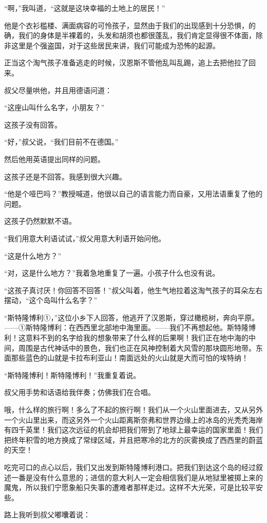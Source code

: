 \documentclass[10pt]{book}
\begin{document}
“啊，”我叫道，“这就是这块幸福的土地上的居民！”

他是个衣衫槛楼、满面病容的可怜孩子，显然由于我们的出现感到十分恐惧，的确，我们的身体是半裸着的，头发和胡须也都很蓬乱，我们肯定显得很不体面，除非这里是个强盗国，对于这些居民来讲，我们可能成为恐怖的起源。

正当这个淘气孩子准备逃走的时候，汉恩斯不管他乱叫乱踢，追上去把他拉了回来。

叔父尽量哄他，并且用德语问道：

“这座山叫什么名字，小朋友？”

这孩子没有回答。

“好，”叔父说，“我们目前不在德国。”

然后他用英语提出同样的问题。

这孩子还是不回答。我感到很大兴趣。

“他是个哑巴吗？”教授喊道，他很以自己的语言能力而自豪，又用法语重复了他的问题。

这孩子仍然默默不语。

“我们用意大利语试试，”叔父用意大利语开始问他。

“这是什么地方？”

“对，这是什么地方？”我着急地重复了一遍。小孩子什么也没有说。

“这孩子真讨厌！你回答不回答！”叔父叫着，他生气地拉着这淘气孩子的耳朵左右摆动，“这个岛叫什么名字？”

“斯特隆博利①，”这位小乡下人回答，他逃开了汉恩斯，穿过橄榄树，奔向平原。——①斯特隆博利：在西西里北部地中海里面。——我们不再想起他。斯特隆博利！这意料不到的名字给我的想象带来了什么样的后果啊！我们正在地中海的中间，周围是古代神话中的景色，我们也正在风神控制着大风雪的那块圆形地带。东面那些蓝色的山就是卡拉布利亚山！南面远处的火山就是大而可怕的埃特纳！

“斯特隆博利！斯特隆博利！”我重复着说。

叔父用手势和话语给我伴奏；仿佛我们在合唱。

哦，什么样的旅行啊！多么了不起的旅行啊！我们从一个火山里面进去，又从另外一个火山里出来，而这另外一个火山距离斯奈弗和世界边缘上的冰岛的光秃秃海岸有四千英里！我们这次远征的机会却把我们带到了地球上最幸运的国家里面！我们把终年积雪的地方换成了常绿区域，并且把寒冷的北方的灰雾换成了西西里的蔚蓝的天空！

吃完可口的点心以后，我们又出发到斯特隆博利港口。把我们到达这个岛的经过叙述一番是没有什么意思的；进信的意大利人一定会相信我们是从地狱里被掷上来的魔鬼，所以我们宁愿象船只失事的遭难者那样走过。这样不大光荣，可是比较平安些。

路上我听到叔父嘟囔着说：
\end{document}
